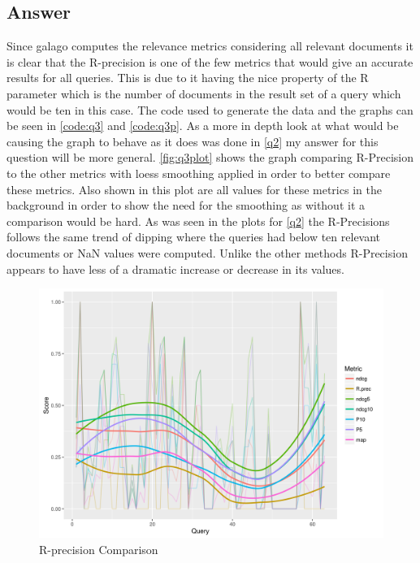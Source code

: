 \documentclass[11pt]{article}
\begin{document}
\subsection{Answer} 
Since galago computes the relevance metrics considering all relevant documents it is clear that the R-precision is one of the few metrics that would give an accurate results for all queries. This is due to it having the nice property of the R parameter which is the number of documents in the result set of a query which would be ten in this case.  The code used to generate the data and the graphs can be seen in \autoref{code:q3} and \autoref{code:q3p}. As a more in depth look at what would be causing the graph to behave as it does was done in \autoref{q2} my answer for this question will be more general. \autoref{fig:q3plot} shows the graph comparing R-Precision to the other metrics with loess smoothing applied in order to better compare these metrics. Also shown in this plot are all values for these metrics in the background in order to show the need for the smoothing as without it a comparison would be hard.  \newline \newline 
As was seen in the plots for \autoref{q2} the R-Precisions follows the same trend of dipping where the queries had below ten relevant documents or NaN values were computed. Unlike the other methods R-Precision appears to have less of a dramatic increase or decrease in its values. 
\begin{figure}[H]
\centering
\includegraphics[scale=0.9]{q3_plot.png}
\caption{R-precision Comparison}
\label{fig:q3plot}
\end{figure}
\end{document}
